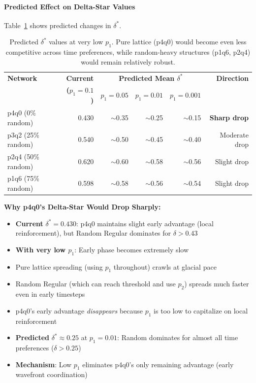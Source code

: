 \documentclass[12pt,a4paper]{article}
\begin{document}
\paragraph{Predicted Effect on Delta-Star Values}

Table~\ref{tab:low_p1_deltastar_prediction} shows predicted changes in $\delta^*$.

\begin{table}[H]
\centering
\begin{tabular}{@{}lrrrrr@{}}
\toprule
\textbf{Network} & \textbf{Current} & \multicolumn{3}{c}{\textbf{Predicted Mean $\delta^*$}} & \textbf{Direction} \\
 & \textbf{($p_1=0.1$)} & $p_1=0.05$ & $p_1=0.01$ & $p_1=0.001$ & \\
\midrule
p4q0 (0\% random)  & 0.430 & $\sim$0.35 & $\sim$0.25 & $\sim$0.15 & \textbf{Sharp drop} \\
p3q2 (25\% random) & 0.540 & $\sim$0.50 & $\sim$0.45 & $\sim$0.40 & Moderate drop \\
p2q4 (50\% random) & 0.620 & $\sim$0.60 & $\sim$0.58 & $\sim$0.56 & Slight drop \\
p1q6 (75\% random) & 0.598 & $\sim$0.58 & $\sim$0.56 & $\sim$0.54 & Slight drop \\
\bottomrule
\end{tabular}
\caption{Predicted $\delta^*$ values at very low $p_1$. Pure lattice (p4q0) would become even less competitive across time preferences, while random-heavy structures (p1q6, p2q4) would remain relatively robust.}
\label{tab:low_p1_deltastar_prediction}
\end{table}

\textbf{Why p4q0's Delta-Star Would Drop Sharply:}
\begin{itemize}
    \item \textbf{Current} $\delta^* = 0.430$: p4q0 maintains slight early advantage (local reinforcement), but Random Regular dominates for $\delta > 0.43$
    \item \textbf{With very low $p_1$}: Early phase becomes extremely slow
    \item Pure lattice spreading (using $p_1$ throughout) crawls at glacial pace
    \item Random Regular (which can reach threshold and use $p_2$) spreads much faster even in early timesteps
    \item p4q0's early advantage \textit{disappears} because $p_1$ is too low to capitalize on local reinforcement
    \item \textbf{Predicted} $\delta^* \approx 0.25$ at $p_1=0.01$: Random dominates for almost all time preferences ($\delta > 0.25$)
    \item \textbf{Mechanism}: Low $p_1$ eliminates p4q0's only remaining advantage (early wavefront coordination)
\end{itemize}
\end{document}
